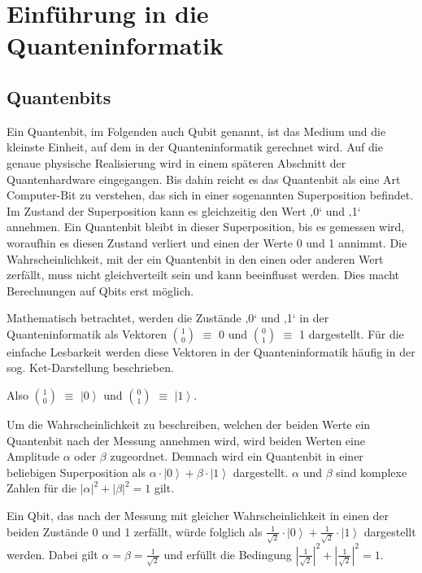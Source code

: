 \section{Einführung in die Quanteninformatik} 
\label{sec:Einführung in die Quanteninformatik}
\subsection{Quantenbits}
Ein Quantenbit, im Folgenden auch Qubit genannt, ist das Medium und die kleinste Einheit, auf dem in der Quanteninformatik gerechnet wird. Auf die genaue physische Realisierung wird in einem späteren Abschnitt der Quantenhardware eingegangen. Bis dahin reicht es das Quantenbit als eine Art Computer-Bit zu verstehen, das sich in einer sogenannten Superposition befindet. Im Zustand der Superposition kann es gleichzeitig den Wert ‚0‘ und ‚1‘ annehmen. Ein Quantenbit bleibt in dieser Superposition, bis es gemessen wird, woraufhin es diesen Zustand verliert und einen der Werte 0 und 1 annimmt. Die Wahrscheinlichkeit, mit der ein Quantenbit in den einen oder anderen Wert zerfällt, muss nicht gleichverteilt sein und kann beeinflusst werden. Dies macht Berechnungen auf Qbits erst möglich.

Mathematisch betrachtet, werden die Zustände ‚0‘ und ‚1‘ in der Quanteninformatik als Vektoren \(\binom{1}{0}\) $\equiv$ 0 und \(\binom{0}{1}\) $\equiv$ 1 dargestellt. Für die einfache Lesbarkeit werden diese Vektoren in der Quanteninformatik häufig in der sog. Ket-Darstellung beschrieben. 

Also \(\binom{1}{0}\) $\equiv$ $\left|0\right\rangle$ und \(\binom{0}{1}\) $\equiv$ $\left|1\right\rangle$. 

Um die Wahrscheinlichkeit zu beschreiben, welchen der beiden Werte ein Quantenbit nach der Messung annehmen wird, wird beiden Werten eine Amplitude $\alpha$ oder $\beta$ zugeordnet. Demnach wird ein Quantenbit in einer beliebigen Superposition als $\alpha\cdot\left|0\right\rangle+\beta\cdot\left|1\right\rangle$ dargestellt. $\alpha$ und $\beta$ sind komplexe Zahlen für die $\left|\alpha\right|^2+\left|\beta\right|^2=1$ gilt. 

Ein Qbit, das nach der Messung mit gleicher Wahrscheinlichkeit in einen der beiden Zustände 0 und 1 zerfällt, würde folglich als $\frac{1}{\sqrt2}\cdot\left|0\right\rangle+\frac{1}{\sqrt2}\cdot\left|1\right\rangle$ dargestellt werden. Dabei gilt $\alpha = \beta = \frac{1}{\sqrt2}$ und erfüllt die Bedingung $\left|\frac{1}{\sqrt2}\right|^2+\left|\frac{1}{\sqrt2}\right|^2=1$.

